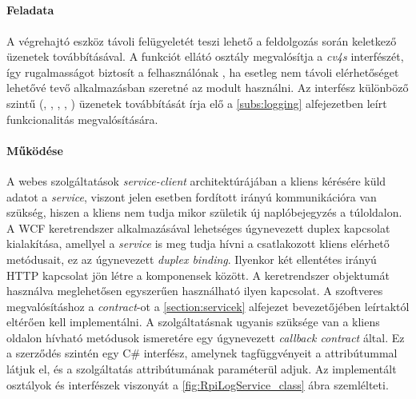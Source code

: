 
\subsection{} \label{subs:rpi_log_service}
\paragraph{Feladata} A végrehajtó eszköz távoli felügyeletét teszi lehető a feldolgozás során keletkező üzenetek továbbításával. A funkciót ellátó osztály megvalósítja a \emph{cv4s}  interfészét, így rugalmasságot biztosít a felhasználónak , ha esetleg nem távoli elérhetőséget lehetővé tevő alkalmazásban szeretné az  modult használni. Az interfész különböző szintű (, , , , ) üzenetek továbbítását írja elő a \ref{subs:logging} alfejezetben leírt funkcionalitás megvalósítására.
\paragraph{Működése} A webes szolgáltatások \emph{service-client} architektúrájában a kliens kérésére küld adatot a \emph{service}, viszont jelen esetben fordított irányú kommunikációra van szükség, hiszen a kliens nem tudja mikor születik új naplóbejegyzés a túloldalon. A WCF keretrendszer alkalmazásával lehetséges úgynevezett duplex kapcsolat kialakítása, amellyel a \emph{service} is meg tudja hívni a csatlakozott kliens elérhető metódusait, ez az úgynevezett \emph{duplex binding}. Ilyenkor két ellentétes irányú HTTP kapcsolat jön létre a komponensek között. A keretrendszer  objektumát használva meglehetősen egyszerűen használható ilyen kapcsolat. A szoftveres megvalósításhoz a \emph{contract}-ot a \ref{section:servicek} alfejezet bevezetőjében leírtaktól eltérően kell implementálni. A szolgáltatásnak ugyanis szüksége van a kliens oldalon hívható metódusok ismeretére egy úgynevezett \emph{callback contract} által. Ez a szerződés szintén egy C\# interfész, amelynek tagfüggvényeit a \code{[ServiceMethod]} attribútummal látjuk el, és a szolgáltatás \code{[OperationContract]} attribútumának paraméterül adjuk. Az implementált osztályok és interfészek viszonyát a \ref{fig:RpiLogService_class} ábra szemlélteti.\\

